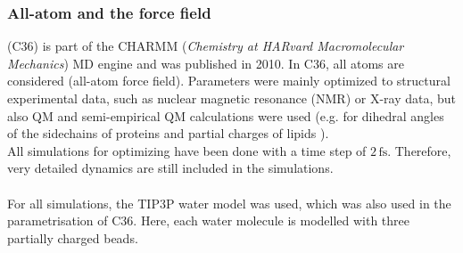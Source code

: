 \subsubsection{All-atom and the \charmm{} force field}
\charmm{} \autocites{charmm36_protein}{charmm36_lipids} (C36) is part of the CHARMM (\textit{Chemistry at HARvard Macromolecular Mechanics}) MD engine and was published in 2010. In C36, all atoms are considered (all-atom force field). Parameters were mainly optimized to structural experimental data, such as nuclear magnetic resonance (NMR) or X-ray data, but also QM and semi-empirical QM calculations were used (e.g. for dihedral angles of the sidechains of proteins \autocite{charmm36_protein} and partial charges of lipids \autocite{charmm36_lipids}).\\
All simulations for optimizing have been done with a time step of $2\,\si{\femto\second}$. Therefore, very detailed dynamics are still included in the simulations.\\
\\
For all simulations, the TIP3P water model \autocite{tip3p} was used, which was also used in the parametrisation of C36. Here, each water molecule is modelled with three partially charged beads.
